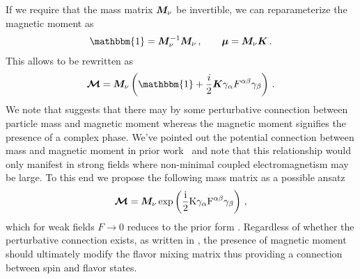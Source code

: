 If we require that the mass matrix $\boldsymbol{M}_{\nu}$ be invertible, we can reparameterize the magnetic moment as 
\begin{align}
	\label{invert:1}
    \mathbbm{1} = \bb{M}_{\nu}^{-1}\bb{M}_{\nu}\,,\qquad
    \bb{\mu} = \bb{M}_{\nu}\bb{K}\,.
\end{align}
This allows  to be rewritten as
\begin{alignat}{1}
	\label{invert:2} {\bb{\mathcal{M}}} = \bb{M}_{\nu}\left(\mathbbm{1} + \frac{i}{2}\bb{K}\gamma_{\alpha}F^{\alpha\beta}\gamma_{\beta}\right)\,.
\end{alignat}
We note that  suggests that there may by some perturbative connection between particle mass and magnetic moment whereas the magnetic moment signifies the presence of a complex phase. We've pointed out the potential connection between mass and magnetic moment in prior work~\citep{Steinmetz:2018ryf} and note that this relationship would only manifest in strong fields where non-minimal coupled electromagnetism may be large. To this end we propose the following mass matrix as a possible ansatz
\begin{alignat}{1}
	\label{mass:eq:10} {\boldsymbol{\mathcal{M}}} = \boldsymbol{M}_{\nu}\,\rm{exp}\left(\frac{i}{2}\boldsymbol{K}\gamma_{\alpha}F^{\alpha\beta}\gamma_{\beta}\right)\,,
\end{alignat}
which for weak fields $F\rightarrow0$ reduces to the prior form . Regardless of whether the perturbative connection exists, as written in , the presence of magnetic moment should ultimately modify the flavor mixing matrix thus providing a connection between spin and flavor states.


